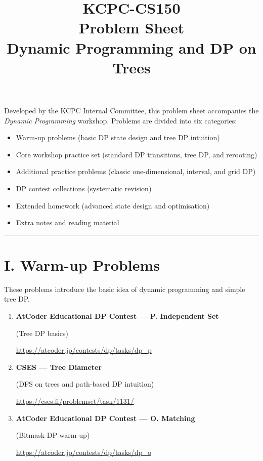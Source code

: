 \documentclass[11pt]{article}
\title{KCPC-CS150 \\ Problem Sheet \\ Dynamic Programming and DP on Trees}
\author{}
\date{}
\begin{document}
\maketitle

\noindent
Developed by the KCPC Internal Committee, this problem sheet accompanies the
\textit{Dynamic Programming} workshop.  
Problems are divided into six categories:

\begin{itemize}
    \item Warm-up problems (basic DP state design and tree DP intuition)
    \item Core workshop practice set (standard DP transitions, tree DP,
          and rerooting)
    \item Additional practice problems (classic one-dimensional, interval,
          and grid DP)
    \item DP contest collections (systematic revision)
    \item Extended homework (advanced state design and optimisation)
    \item Extra notes and reading material
\end{itemize}

\hrule
\vspace{1em}

\section*{I. Warm-up Problems}

These problems introduce the basic idea of dynamic programming and simple
tree DP.

\begin{enumerate}

\item \textbf{AtCoder Educational DP Contest --- P. Independent Set}

(Tree DP basics)

\vspace{0.3em}
{\url{https://atcoder.jp/contests/dp/tasks/dp_p}}

\vspace{0.8em}

\item \textbf{CSES --- Tree Diameter}

(DFS on trees and path-based DP intuition)

\vspace{0.3em}
{\url{https://cses.fi/problemset/task/1131/}}

\vspace{0.8em}

\item \textbf{AtCoder Educational DP Contest --- O. Matching}

(Bitmask DP warm-up)

\vspace{0.3em}
{\url{https://atcoder.jp/contests/dp/tasks/dp_o}}

\end{enumerate}
\end{document}
